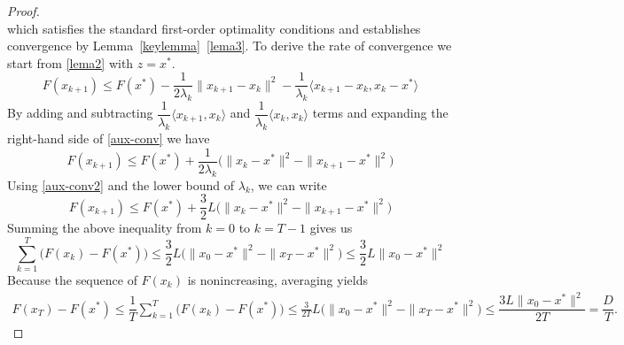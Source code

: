 \documentclass[10pt,a4paper]{amsart}
\begin{document}
\begin{proof}
{\begin{equation*}
\end{equation*}
which satisfies the standard first-order optimality conditions and establishes convergence by Lemma~\ref{keylemma}~\ref{lema3}.}
To derive the rate of convergence we start from \ref{lema2} with $z = x^*$.
\begin{equation}\label{aux-conv}
   F(x_{k+1}) \leq F(x^*) - \dfrac{1}{2\lambda_k} \|x_{k+1} - x_k\|^2 - \dfrac{1}{\lambda_k}\langle x_{k+1} - x_k, x_k -  x^* \rangle  
\end{equation}
By adding and subtracting $\dfrac{1}{\lambda_k} \langle x_{k+1}, x_k \rangle$ and $\dfrac{1}{\lambda_k} \langle x_k, x_k \rangle$ terms and expanding the right-hand side of \eqref{aux-conv} we have  
\begin{equation}\label{aux-conv2}
     F(x_{k+1}) \leq F(x^*) + \dfrac{1}{2\lambda_k}\Big(\|x_k - x^*\|^2 - \|x_{k+1} - x^*\|^2\Big)
\end{equation}
{\color{black} Using \eqref{aux-conv2} and the lower bound of $\lambda_k$, we can write
\begin{equation*}
    F(x_{k+1}) \leq F(x^*) + \frac{3}{2}L\Big(\|x_k - x^*\|^2 - \|x_{k+1} - x^*\|^2\Big)
\end{equation*}
Summing the above inequality from $k = 0$ to $k = T-1$ gives us
\begin{equation*}
    \sum_{k=1}^{T}\Big(F(x_k) - F(x^*)\Big) \leq \frac{3}{2}L\Big(\|x_0 - x^*\|^2 - \|x_T - x^*\|^2\Big) \leq \frac{3}{2}L\|x_0 - x^*\|^2
\end{equation*}
Because the sequence of $F(x_k)$ is nonincreasing, averaging yields
\begin{align*}
    F(x_T) - F(x^*) \leq \dfrac{1}{T}\sum_{k=1}^{T}\Big(F(x_k) - F(x^*)\Big) \leq \frac{3}{2T}L\Big(\|x_0 - x^*\|^2 - \|x_T - x^*\|^2\Big) \leq \dfrac{3L\|x_0 - x^*\|^2}{2T} = \dfrac{D}{T}.
\end{align*}}
\end{proof}
\end{document}
